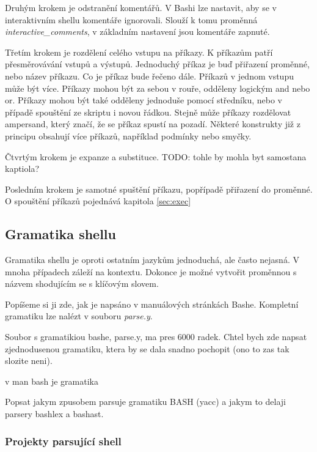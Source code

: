\documentclass[thesis=M,czech]{FITthesis}[2012/06/26]
\begin{document}
Druhým krokem je odstranění komentářů. V Bashi lze nastavit, aby se v interaktivním shellu komentáře ignorovali. Slouží k tomu proměnná \textit{interactive\_comments}, v základním nastavení jsou komentáře zapnuté.

Třetím krokem je rozdělení celého vstupu na příkazy. K příkazům patří přesměrovávání vstupů a výstupů. Jednoduchý příkaz je buď přiřazení proměnné, nebo název příkazu. Co je příkaz bude řečeno dále. Příkazů v jednom vstupu může být více. Příkazy mohou být za sebou v rouře, odděleny logickým and nebo or. Příkazy mohou být také odděleny jednoduše pomocí středníku, nebo v případě spouštění ze skriptu i novou řádkou. Stejně může příkazy rozdělovat ampersand, který značí,  že se příkaz spustí na pozadí. Některé konstrukty již z principu obsahují více příkazů, například podmínky nebo smyčky.

Čtvrtým krokem je expanze a substituce. TODO: tohle by mohla byt samostana kaptiola?

Posledním  krokem je samotné spuštění příkazu, popřípadě přiřazení do proměnné. O spouštění příkazů pojednává kapitola \ref{sec:exec}




%
%
%
\subsection{Gramatika shellu}

Gramatika shellu je oproti ostatním jazykům jednoduchá, ale často nejasná. V mnoha případech záleží na kontextu. Dokonce je možné vytvořit proměnnou s názvem shodujícím se s klíčovým slovem.

Popíšeme si ji zde, jak je napsáno v manuálových stránkách Bashe. Kompletní gramatiku lze nalézt v souboru \textit{parse.y}.





Soubor s gramatikiou bashe, parse.y, ma pres 6000 radek. Chtel bych zde napsat zjednodusenou gramatiku, ktera by se dala snadno pochopit (ono to zas tak slozite neni).

v man bash je gramatika

Popsat jakym zpusobem parsuje gramatiku BASH (yacc) a jakym to delaji parsery bashlex a bashast.



\subsubsection{Projekty parsující shell}
\end{document}
